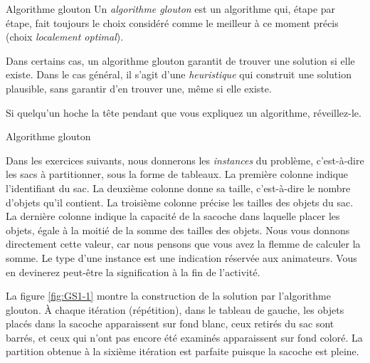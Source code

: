 \documentclass[a4paper,twoside]{article}
\begin{document}
  \begin{definition}{Algorithme glouton}
    Un \emph{algorithme glouton} est un algorithme qui, étape par étape, fait toujours le choix considéré comme le meilleur à ce moment précis (choix \emph{localement optimal}).
  \end{definition}

    Dans certains cas, un algorithme glouton garantit de trouver une solution si elle existe.
    Dans le cas général, il s'agit d'une \emph{heuristique} qui construit une solution plausible, sans garantir d'en trouver une, même si elle existe.

  \begin{epigramme}
    Si quelqu'un hoche la tête pendant que vous expliquez un algorithme, réveillez-le.
  \end{epigramme}


  \begin{algorithme}{Algorithme glouton}
    \label{algo:gs}
    
  \end{algorithme}


  Dans les exercices suivants, nous donnerons les \emph{instances} du problème, c'est-à-dire les sacs à partitionner, sous la forme de tableaux.
  La première colonne indique l'identifiant du sac.
  La deuxième colonne donne sa taille, c'est-à-dire le nombre d'objets qu'il contient.
  La troisième colonne précise les tailles des objets du sac.
  La dernière colonne indique la capacité de la sacoche dans laquelle placer les objets, égale à la moitié de la somme des tailles des objets.
  Nous vous donnons directement cette valeur, car nous pensons que vous avez la flemme de calculer la somme.
  Le type d'une instance est une indication réservée aux animateurs. Vous en devinerez peut-être la signification à la fin de l'activité.


  


  La figure \ref{fig:GS1-1} montre la construction de la solution par l'algorithme glouton.
  À chaque itération (répétition), dans le tableau de gauche, les objets placés dans la sacoche apparaissent sur fond blanc, ceux retirés du sac sont barrés, et ceux qui n'ont pas encore été examinés apparaissent sur fond coloré.
  La partition obtenue à la sixième itération est parfaite puisque la sacoche est pleine.
\end{document}
